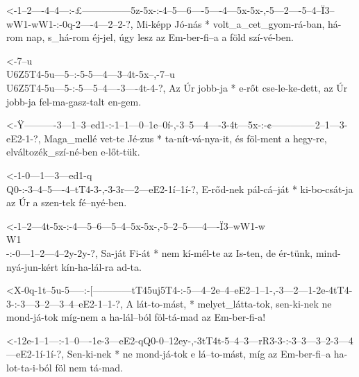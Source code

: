 

  {<-1--2----4--4---:-£---------------5z-5x-:-4--5---6----5----4---5x-5x-,-5---2----5--4--Ï3--wW1-wW1-:-0q-2----4---2--2-?,}
  {  Mi-képp Jó-nás * volt_a_cet_gyom-rá-ban, há-rom nap, s_há-rom éj-jel, úgy lesz az Em-ber-fi--a     a  föld szí-vé-ben.}



  {<-7--u\\U6Z5T4-5u---5--:-5-5---4---3--4t-5x--,-7--u\\U6Z5T4-5u---5-:-5---5--4----3----4t-4-?,}
  {  Az Úr        jobb-ja * e-rőt cse-le-ke-dett, az Úr        jobb-ja  fel-ma-gasz-talt en-gem.}

  {<-Ÿ----------3---1--3--ed1-:-1--1---0--1e--0í-,-3--5---4----3-4t---5x-:-¢--------------2--1---3-eE2-1-?,}
  {  Maga_mellé vet-te Jé-zus * ta-nít-vá-nya-it,  és föl-ment a hegy-re,  elváltozék_szí-né-ben e-lőt-tük.}


  {<-1-0---1---3---ed1-q\\Q0-:-3--4--5----4--tT4-3-,-3-3r---2---eE2-1í--1í-?,}
  {  E-rőd-nek pál-cá--ját   * ki-bo-csát-ja az  Úr  a szen-tek fé--nyé-ben.}

  {<-1--2---4t-5x-:-4---5--6---5--4--5x-5x-,-5--2--5-----4----Ï3--wW1-w\\W1\\-:-0---1--2---4--2y-2y-?,}
  {  Sa-ját Fi-át * nem kí-mél-te az Is-ten, de ér-tünk, mind-nyá-jun-kért      kín-ha-lál-ra ad-ta.}

  {<X-0q-1t--5u-5-----:-[------------tT45uj5T4-:-5---4--2e--4--eE2--1--1-,-3---2---1-2e-4tT4-3-:-3---3--2---3--4--eE2-1--1-?,}
  {   A  lát-to-mást, * melyet_látta-tok,        sen-ki-nek ne mond-já-tok míg-nem a ha-lál--ból föl-tá-mad az Em-ber-fi-a!}


  {<-12e-1--1---:-1--0----1e-3---eE2-qQ0-0--12ey-,-3tT4t-5--4--3---rR3-3-:-3--3---3--2-3---4---eE2-1í-1í-?,}
  {  Sen-ki-nek * ne mond-já-tok e   lá--to-mást,  míg   az Em-ber-fi--a   ha-lot-ta-i-ból föl nem tá-mad.}

